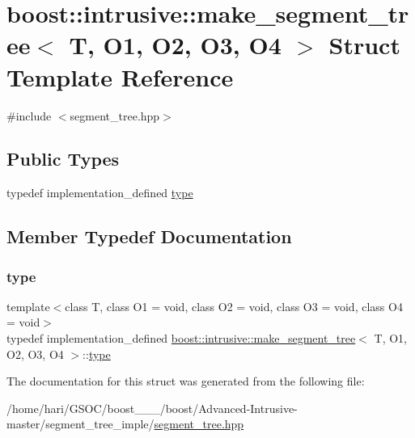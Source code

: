 \hypertarget{structboost_1_1intrusive_1_1make__segment__tree}{}\section{boost\+:\+:intrusive\+:\+:make\+\_\+segment\+\_\+tree$<$ T, O1, O2, O3, O4 $>$ Struct Template Reference}
\label{structboost_1_1intrusive_1_1make__segment__tree}


{\ttfamily \#include $<$segment\+\_\+tree.\+hpp$>$}

\subsection*{Public Types}
\begin{DoxyCompactItemize}
\item 
typedef implementation\+\_\+defined \hyperlink{structboost_1_1intrusive_1_1make__segment__tree_ac52c74ebd4a40dc2d3f2a37145bfe469}{type}
\end{DoxyCompactItemize}


\subsection{Member Typedef Documentation}
\mbox{\label{structboost_1_1intrusive_1_1make__segment__tree_ac52c74ebd4a40dc2d3f2a37145bfe469}} 
\subsubsection{\texorpdfstring{type}{type}}
{\footnotesize\ttfamily template$<$class T, class O1 = void, class O2 = void, class O3 = void, class O4 = void$>$ \\
typedef implementation\+\_\+defined \hyperlink{structboost_1_1intrusive_1_1make__segment__tree}{boost\+::intrusive\+::make\+\_\+segment\+\_\+tree}$<$ T, O1, O2, O3, O4 $>$\+::\hyperlink{structboost_1_1intrusive_1_1make__segment__tree_ac52c74ebd4a40dc2d3f2a37145bfe469}{type}}



The documentation for this struct was generated from the following file\+:\begin{DoxyCompactItemize}
\item 
/home/hari/\+G\+S\+O\+C/boost\+\_\+\_\+\_/boost/\+Advanced-\/\+Intrusive-\/master/segment\+\_\+tree\+\_\+imple/\hyperlink{segment__tree_8hpp}{segment\+\_\+tree.\+hpp}\end{DoxyCompactItemize}
